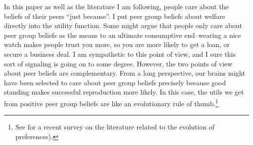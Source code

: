 In this paper as well as the literature I am following, people care about the beliefs of their peers ``just because''.  I put peer group beliefs about welfare directly into the utility function.  Some might argue that people only care about peer group beliefs as the means to an ultimate consumptive end--wearing a nice watch makes people trust you more, so you are more likely to get a loan, or secure a business deal.  I am sympathetic to this point of view, and I sure this sort of signaling is going on to some degree.  However, the two points of view about peer beliefs are complementary.  From a long perspective, our brains might have been selected to care about peer group beliefs precisely because good standing makes successful reproduction more likely. In this case, the utils we get from positive peer group beliefs are like an evolutionary rule of thumb.\footnote{See \citep{RobsonSamuelson2010} for a recent survey on the literature related to the evolution of preferences).}

